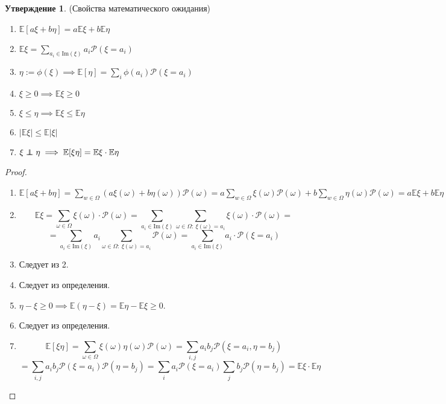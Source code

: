 \documentclass[11pt,a4paper]{report}
\def\E{\mathbb{E}}
\def\prob{\mathcal{P}}
\newcommand\independent{\protect\mathpalette{\protect\independenT}{\perp}}
\def\independenT#1#2{\mathrel{\rlap{$#1#2$}\mkern2mu{#1#2}}}
\theoremstyle{definition}
\theoremstyle{definition}
\newtheorem{preposition}{Утверждение}[section]
\theoremstyle{definition}
\begin{document}
		\begin{preposition}(Свойства математического ожидания)
			\begin{enumerate}
				\item $ \E[a \xi + b \eta] = a\E\xi + b \E\eta$
				\item $ \E\xi = \sum_{a_{i} \in \mbox{Im}(\xi)}{a_{i} \prob(\xi = a_{i})} $
				\item $ \eta := \phi(\xi) \implies \E[\eta] = \sum_{i}{\phi(a_{i}) \prob(\xi = a_{i})} $
				\item $ \xi \ge 0 \implies \E\xi \ge 0 $
				\item $ \xi \le \eta \implies \E \xi  \le \E \eta  $
				\item $ |\E \xi| \le \E |\xi| $
				\item $ \xi \independent \eta \implies \E[\xi \eta] = \E\xi \cdot \E\eta$
			\end{enumerate}
		\end{preposition}
		\begin{proof} $ $\\
			\begin{enumerate}
				\item 
				$
					\E[a\xi + b\eta] = \sum_{w\in\Omega}{(a\xi(\omega) + b\eta(\omega))\prob(\omega)} = a\sum_{w\in\Omega}{\xi(\omega)\prob(\omega)} + b\sum_{w\in\Omega}{\eta(\omega)\prob(\omega)} = a\E\xi + b\E\eta
				$
				\item 
				\[ 
					\E\xi = \sum_{\omega \in \Omega}{\xi(\omega) \cdot \prob(\omega)} = \sum_{a_{i} \in \mbox{Im}(\xi)}{\sum_{\omega \in \Omega:\ \xi(\omega) = a_{i}}{\xi(\omega) \cdot \prob(\omega)}} = \]
				\[
					= \sum_{a_{i} \in \mbox{Im}(\xi)}{a_{i} \sum_{\omega \in \Omega:\ \xi(\omega) = a_{i}}{ \prob(\omega)} } = \sum_{a_{i} \in \mbox{Im}(\xi)}{a_{i} \cdot \prob(\xi = a_{i})} \]
				\item Следует из 2.
				\item Следует из определения.
				\item $ \eta - \xi \ge 0 \implies \E(\eta - \xi) = \E\eta - \E\xi \ge 0$.
				\item Следует из определения.
				\item 
				\[ 
					\E[\xi\eta] = \sum_{\omega\in\Omega}{\xi(\omega)\eta(\omega)\prob(\omega)} = \sum_{i, j}{a_{i}b_{j}\prob(\xi = a_{i}, \eta = b_{j})} 
				\]
				\[
					= \sum_{i, j}{a_{i}b_{j}\prob(\xi = a_{i})\prob(\eta = b_{j})} = \sum_{i}{a_{i}\prob(\xi = a_{i})}\sum_{j}{b_{j}\prob(\eta = b_{j})} = \E\xi \cdot \E\eta 
				\]
			\end{enumerate}
		\end{proof}
\end{document}
